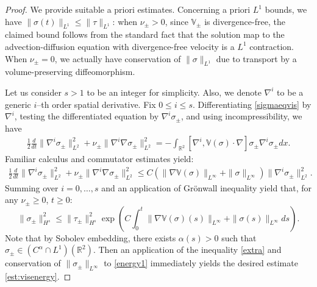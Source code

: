 \documentclass[11pt,reqno]{amsproc}
\newcommand{\na}{\nabla}
\newcommand{\R}{\mathbb{R}}
\newcommand{\V}{\mathbb{V}}
\begin{document}
\begin{proof}
    We provide suitable a priori estimates. Concerning a priori $L^1$ bounds, we have $\|\sigma(t)\|_{L^1} \le \|\tau\|_{L^1}$: when $\nu_\pm > 0$, since $\V_\pm$ is divergence-free, the claimed bound follows from the standard fact that the solution map to the advection-diffusion equation with divergence-free velocity is a $L^1$ contraction. When $\nu_\pm = 0$, we actually have conservation of $\|\sigma\|_{L^1}$ due to transport by a volume-preserving diffeomorphism.
    
    Let us consider $s > 1$ to be an integer for simplicity. Also, we denote $\na^i$ to be a generic $i$--th order spatial derivative. Fix $0 \le i \le s$. Differentiating \eqref{sigmaeqvis} by $\na^i$, testing the differentiated equation by $\nabla^i \sigma_\pm$, and using incompressibility, we have
    \begin{align*}
        \frac12 \frac{d}{dt}\|\nabla^i \sigma_\pm\|_{L^2}^2 + \nu_\pm \|\nabla^i \nabla\sigma_\pm\|_{L^2}^2 = -\int_{\R^2} [\na^i, \mathbb V(\sigma)\cdot \nabla] \sigma_\pm \nabla^i \sigma_\pm dx.
    \end{align*}
    Familiar calculus and commutator estimates yield:
    \begin{align*}
        \frac12 \frac{d}{dt}\|\nabla^i \sigma_\pm\|_{L^2}^2 + \nu_\pm \|\nabla^i \nabla\sigma_\pm\|_{L^2}^2 \le C(\|\nabla \mathbb V(\sigma)\|_{L^\infty} + \|\sigma\|_{L^\infty})\|\nabla^i \sigma_\pm\|_{L^2}^2.
    \end{align*}
    Summing over $i= 0,\hdots, s$ and an application of Gr\"onwall inequality yield that, for any $\nu_\pm \ge 0$, $t \ge 0$:
    \begin{equation}
        \label{energy1}
        \|\sigma_\pm\|_{H^s}^2 \le \|\tau_\pm\|_{H^s}^2 \exp\left(C\int_0^t \|\nabla \mathbb V(\sigma)(s)\|_{L^\infty} + \|\sigma(s)\|_{L^\infty} ds\right).
    \end{equation}
    Note that by Sobolev embedding, there exists $\alpha(s) > 0$ such that $\sigma_\pm \in (C^\alpha \cap L^1)(\R^2)$. Then an application of the inequality \eqref{extra} and conservation of $\|\sigma_\pm\|_{L^\infty}$ to \eqref{energy1} immediately yields the desired estimate \eqref{est:visenergy}.
\end{proof}
\end{document}
